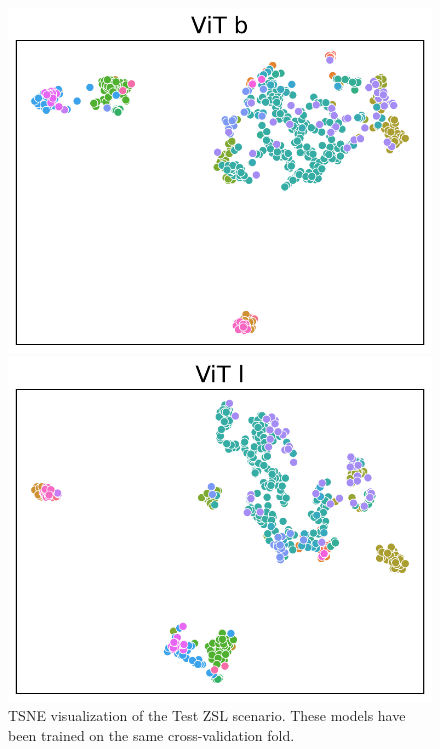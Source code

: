\begin{figure}[htbp]
    \begin{minipage}{0.4\linewidth}
        \centering
        \includegraphics[width=\linewidth]{images/ViT.csv_b_0.pdf}
    \end{minipage}
    \begin{minipage}{0.4\linewidth}
        \centering
        \includegraphics[width=\linewidth]{images/ViT.csv_l_0.pdf}
    \end{minipage}
    \caption{TSNE visualization of the Test ZSL scenario. These models have been trained on the same cross-validation fold.\label{fig:tsne}}
\end{figure}

